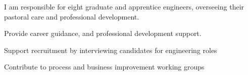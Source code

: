 {}
I am responsible for eight graduate and apprentice engineers, overseeing their pastoral care and professional development.
\vspace{0.25em}
\begin{tightemize}
  \item Provide career guidance, and professional development support.
  \item Support recruitment by interviewing candidates for engineering roles
  \item Contribute to process and business improvement working groups
\end{tightemize}
\sectionsep
